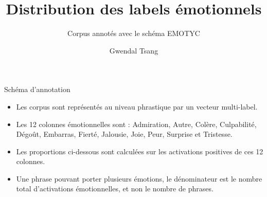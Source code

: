 \documentclass[aspectratio=169,10pt,xcolor=table]{beamer}
\title{Distribution des labels émotionnels}
\subtitle{Corpus annotés avec le schéma EMOTYC}
\author{Gwendal Tsang}
\institute{ONERA}
\date{}
\begin{document}
\begin{frame}
  \titlepage
\end{frame}

\begin{frame}{Schéma d'annotation}
\small
\begin{itemize}
  \item Les corpus sont représentés au niveau phrastique par un vecteur multi-label.
  \item Les 12 colonnes émotionnelles sont : Admiration, Autre, Colère, Culpabilité, Dégoût, Embarras, Fierté, Jalousie, Joie, Peur, Surprise et Tristesse.
  \item Les proportions ci-dessous sont calculées sur les activations positives de ces 12 colonnes.
  \item Une phrase pouvant porter plusieurs émotions, le dénominateur est le nombre total d'activations émotionnelles, et non le nombre de phrases.
\end{itemize}
\end{frame}
\end{document}
